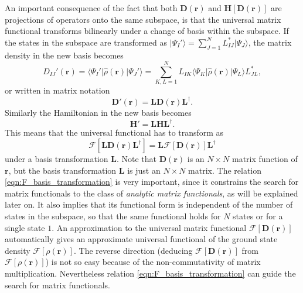 \documentclass[journal=jpclcd,manuscript=letter]{achemso}
\newcommand\m[1]{\mathbf{#1}}
\renewcommand\vec[1]{\mathbf{#1}}
\begin{document}
An important consequence of the fact that both $\m{D}(\vec{r})$ and $\m{H}[\m{D}(\vec{r})]$ are projections of operators onto the same subspace, is
that the universal matrix functional transforms bilinearly under a change of basis within the subspace. \cite[(3)]{Lu2022JPCL}
If the states in the subspace are transformed as $\vert \Psi_I' \rangle = \sum_{J=1}^N L^*_{IJ} \vert \Psi_J \rangle$,
the matrix density in the new basis becomes
\begin{equation}
D_{IJ}'(\vec{r}) = \langle \Psi_I' \vert \hat{\rho}(\vec{r}) \vert \Psi_J' \rangle
= \sum_{K,L=1}^{N} L_{IK} \langle \Psi_K \vert \hat{\rho}(\vec{r}) \vert \Psi_L \rangle L^*_{JL},
\end{equation}
or written in matrix notation
\begin{equation}
\m{D}'(\vec{r}) = \m{L} \m{D}(\vec{r}) \m{L}^{\dagger}.
\end{equation}
Similarly the Hamiltonian in the new basis becomes
\begin{equation}
\m{H}' = \m{L} \m{H} \m{L}^{\dagger}.
\end{equation}
This means that the universal functional has to transform as \cite{Lu2022JPCL}
\begin{equation}
 \m{\mathcal{F}}[\m{L} \m{D}(\vec{r}) \m{L}^{\dagger}] = \m{L} \m{\mathcal{F}}[\m{D}(\vec{r})] \m{L}^{\dagger} \label{eqn:F_basis_transformation}
\end{equation}
under a basis transformation $\m{L}$. Note that $\m{D}(\vec{r})$ is an $N \times N$ matrix function of $\vec{r}$,
but the basis transformation $\m{L}$ is just an $N \times N$ matrix.
 The relation \ref{eqn:F_basis_transformation} is very important, since it constrains
the search for matrix functionals to the class of \emph{analytic matrix functionals}, as will be explained later on.
It also implies that its functional form
is independent of the number of states in the subspace, so that the same functional holds for $N$ states or for a single state $1$.
An approximation to the universal matrix functional $\m{\mathcal{F}}[\m{D}(\vec{r})]$ automatically gives an approximate universal
functional of the ground state density $\mathcal{F}[\rho(\vec{r})]$. The reverse direction (deducing $\m{\mathcal{F}}[\m{D}(\vec{r})]$
from $\mathcal{F}[\rho(\vec{r})]$) is not so easy because of the non-commutativity of matrix multiplication.
Nevertheless relation \ref{eqn:F_basis_transformation} can guide the search for matrix functionals.
\end{document}

